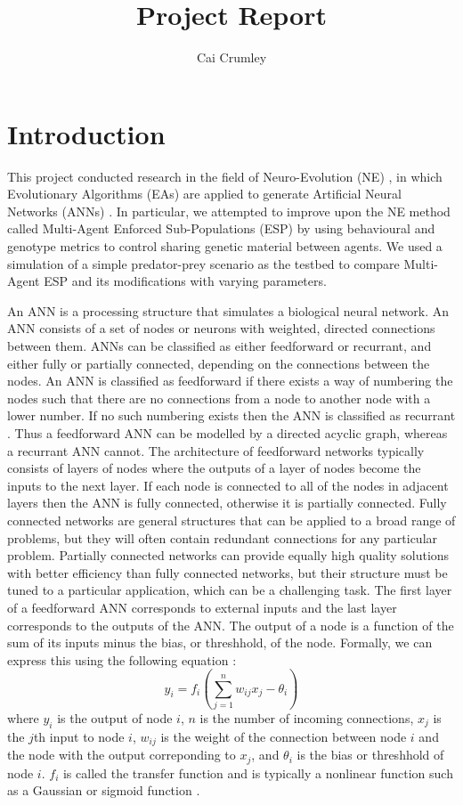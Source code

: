 \documentclass[12pt]{article} %
\title{Project Report}
\author{Cai Crumley}
\begin{document}
\maketitle

\section{Introduction}

This project conducted research in the field of Neuro-Evolution (NE) \cite{Montana1989}, in which Evolutionary Algorithms (EAs) \cite{Back1993} are applied to generate Artificial Neural Networks (ANNs) \cite{Yegnanarayana2004}. In particular, we attempted to improve upon the NE method called Multi-Agent Enforced Sub-Populations (ESP) \cite{Moriarty1997}\cite{Yong2001} by using behavioural and genotype metrics to control sharing genetic material between agents. We used a simulation of a simple predator-prey scenario \cite{Gomez1997} as the testbed to compare Multi-Agent ESP and its modifications with varying parameters.

An ANN is a processing structure that simulates a biological neural network. An ANN consists of a set of nodes or neurons with weighted, directed connections between them. ANNs can be classified as either feedforward or recurrant, and either fully or partially connected, depending on the connections between the nodes. An ANN is classified as feedforward if there exists a way of numbering the nodes such that there are no connections from a node to another node with a lower number. If no such numbering exists then the ANN is classified as recurrant \cite{Yao1999}. Thus a feedforward ANN can be modelled by a directed acyclic graph, whereas a recurrant ANN cannot.
The architecture of feedforward networks typically consists of layers of nodes where the outputs of a layer of nodes become the inputs to the next layer. If each node is connected to all of the nodes in adjacent layers then the ANN is fully connected, otherwise it is partially connected. Fully connected networks are general structures that can be applied to a broad range of problems, but they will often contain redundant connections for any particular problem. Partially connected networks can provide equally high quality solutions with better efficiency than fully connected networks, but their structure must be tuned to a particular application, which can be a challenging task. The first layer of a feedforward ANN corresponds to external inputs and the last layer corresponds to the outputs of the ANN. The output of a node is a function of the sum of its inputs minus the bias, or threshhold, of the node. Formally, we can express this using the following equation \cite{Yao1999}:
\[
y_i = f_i \left(\sum_{j = 1} ^n w_{ij}x_j - \theta_i \right)
\]
where $y_i$ is the output of node $i$, $n$ is the number of incoming connections, $x_j$ is the $j$th input to node $i$, $w_{ij}$ is the weight of the connection between node $i$ and the node with the output correponding to $x_j$, and $\theta_i$ is the bias or threshhold of node $i$. $f_i$ is called the transfer function and is typically a nonlinear function such as a Gaussian or sigmoid function \cite{Yao1999}.
\end{document}
